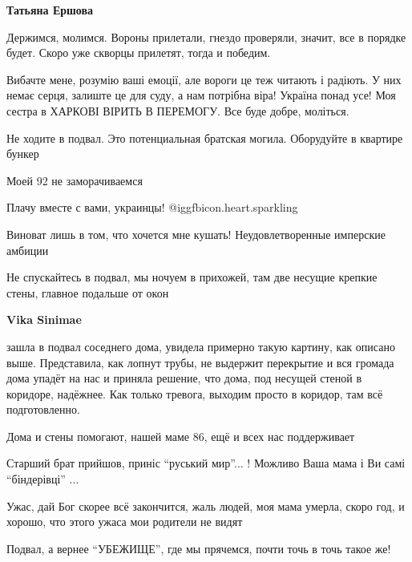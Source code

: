 \begin{itemize}
\textbf{Татьяна Ершова} 

Держимся, молимся. Вороны прилетали, гнездо проверяли, значит, все в порядке
будет. Скоро уже скворцы прилетят, тогда и победим.


Вибачте мене, розумію ваші емоції, але вороги це теж читають і радіють. У них
немає серця, залиште це для суду, а нам потрібна віра! Україна понад усе! Моя
сестра в ХАРКОВІ ВІРИТЬ В ПЕРЕМОГУ. Все буде добре, моліться.

Не ходите в подвал. Это потенциальная братская могила. Оборудуйте в квартире бункер

Моей 92 не заморачиваемся


Плачу вместе с вами, украинцы!  @igg{fbicon.heart.sparkling} 


Виноват лишь в том, что хочется мне кушать! Неудовлетворенные имперские амбиции


Не спускайтесь в подвал, мы ночуем в прихожей, там две несущие крепкие стены,
главное подальше от окон

\textbf{Vika Sinimae} 

зашла в подвал соседнего дома, увидела примерно такую картину, как описано
выше. Представила, как лопнут трубы, не выдержит перекрытие и вся громада дома
упадёт на нас и приняла решение, что дома, под несущей стеной в коридоре,
надёжнее. Как только тревога, выходим просто в коридор, там всё подготовленно.

Дома и стены помогают, нашей маме 86, ещё и всех нас поддерживает

Старший брат прийшов, приніс \enquote{руський мир}... ! Можливо Ваша мама і Ви самі \enquote{біндерівці} ...


Ужас, дай Бог скорее всё закончится, жаль людей, моя мама умерла, скоро год, и
хорошо, что этого ужаса мои родители не видят


Подвал, а вернее \enquote{УБЕЖИЩЕ}, где мы прячемся, почти точь в точь такое же!



\end{itemize}
